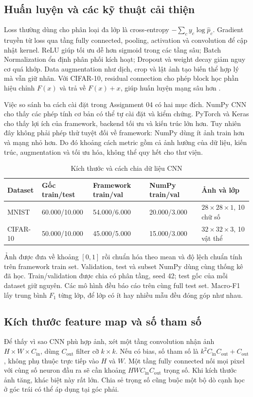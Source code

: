 \documentclass[12pt,a4paper]{report}
\begin{document}
\subsection{Huấn luyện và các kỹ thuật cải thiện}
Loss thường dùng cho phân loại đa lớp là cross-entropy $-\sum_c y_c\log\hat p_c$. Gradient truyền từ loss qua tầng fully connected, pooling, activation và convolution để cập nhật kernel. ReLU giúp tối ưu dễ hơn sigmoid trong các tầng sâu; Batch Normalization ổn định phân phối kích hoạt; Dropout và weight decay giảm nguy cơ quá khớp. Data augmentation như dịch, crop và lật ảnh tạo biến thể hợp lý mà vẫn giữ nhãn. Với CIFAR-10, residual connection cho phép block học phần hiệu chỉnh $F(x)$ và trả về $F(x)+x$, giúp huấn luyện mạng sâu hơn \cite{resnet2016}.

Việc so sánh ba cách cài đặt trong Assignment 04 có hai mục đích. NumPy CNN cho thấy các phép tính cơ bản có thể tự cài đặt và kiểm chứng. PyTorch và Keras cho thấy lợi ích của framework, backend tối ưu và kiến trúc lớn hơn. Tuy nhiên đây không phải phép thử tuyệt đối về framework: NumPy dùng ít ảnh train hơn và mạng nhỏ hơn. Do đó khoảng cách metric gồm cả ảnh hưởng của dữ liệu, kiến trúc, augmentation và tối ưu hóa, không thể quy hết cho thư viện.

\begin{table}[htbp]\centering\caption{Kích thước và cách chia dữ liệu CNN}\label{tab:cnn-splits}
\footnotesize\begin{tabularx}{\textwidth}{p{1.7cm}p{2.2cm}p{2.3cm}p{2.3cm}X}
\toprule\textbf{Dataset} & \textbf{Gốc train/test} & \textbf{Framework train/val} & \textbf{NumPy train/val} & \textbf{Ảnh và lớp}\\\midrule
MNIST & 60.000/10.000 & 54.000/6.000 & 20.000/3.000 & $28\times28\times1$, 10 chữ số\\
CIFAR-10 & 50.000/10.000 & 45.000/5.000 & 15.000/3.000 & $32\times32\times3$, 10 vật thể\\
\bottomrule\end{tabularx}\end{table}

Ảnh được đưa về khoảng $[0,1]$ rồi chuẩn hóa theo mean và độ lệch chuẩn tính trên framework train set. Validation, test và subset NumPy dùng cùng thống kê đã học. Train/validation được chia có phân tầng, seed 42; test gốc của mỗi dataset giữ nguyên. Các mô hình đều báo cáo trên cùng full test set. Macro-F1 lấy trung bình $F_1$ từng lớp, để lớp có ít hay nhiều mẫu đều đóng góp như nhau.

\subsection{Kích thước feature map và số tham số}
Để thấy vì sao CNN phù hợp ảnh, xét một tầng convolution nhận ảnh $H\times W\times C_{\mathrm{in}}$, dùng $C_{\mathrm{out}}$ filter cỡ $k\times k$. Nếu có bias, số tham số là $k^2C_{\mathrm{in}}C_{\mathrm{out}}+C_{\mathrm{out}}$, không phụ thuộc trực tiếp vào $H$ và $W$. Một tầng fully connected nối mọi pixel với cùng số neuron đầu ra sẽ cần khoảng $HWC_{\mathrm{in}}C_{\mathrm{out}}$ trọng số. Khi kích thước ảnh tăng, khác biệt này rất lớn. Chia sẻ trọng số cũng buộc một bộ dò cạnh học ở góc trái có thể áp dụng tại góc phải.
\end{document}
